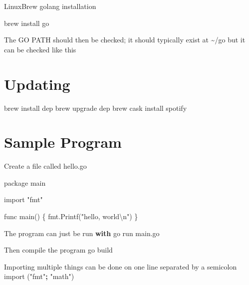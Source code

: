 \documentclass[]{book}
\newenvironment{Shaded}{\begin{snugshade}}{\end{snugshade}}
\newcommand{\BuiltInTok}[1]{#1}
\newcommand{\CharTok}[1]{\textcolor[rgb]{0.31,0.60,0.02}{#1}}
\newcommand{\ControlFlowTok}[1]{\textcolor[rgb]{0.13,0.29,0.53}{\textbf{#1}}}
\newcommand{\ExtensionTok}[1]{#1}
\newcommand{\ImportTok}[1]{#1}
\newcommand{\NormalTok}[1]{#1}
\newcommand{\OperatorTok}[1]{\textcolor[rgb]{0.81,0.36,0.00}{\textbf{#1}}}
\newcommand{\StringTok}[1]{\textcolor[rgb]{0.31,0.60,0.02}{#1}}
\newcommand{\VariableTok}[1]{\textcolor[rgb]{0.00,0.00,0.00}{#1}}
\begin{document}
LinuxBrew golang installation

\begin{Shaded}
\begin{Highlighting}[]
\ExtensionTok{brew}\NormalTok{ install go}
\end{Highlighting}
\end{Shaded}

The GO PATH should then be checked; it should typically exist at \textasciitilde{}/go but it can be checked like this

\begin{Shaded}
\end{Shaded}

\hypertarget{updating}{%
\section{Updating}\label{updating}}

\begin{Shaded}
\begin{Highlighting}[]
\ExtensionTok{brew}\NormalTok{ install dep}
\ExtensionTok{brew}\NormalTok{ upgrade dep}
\ExtensionTok{brew}\NormalTok{ cask install spotify}
\end{Highlighting}
\end{Shaded}

\hypertarget{sample-program}{%
\section{Sample Program}\label{sample-program}}

Create a file called hello.go

\begin{Shaded}
\begin{Highlighting}[]
\NormalTok{package main}

\ImportTok{import} \StringTok{"fmt"}

\NormalTok{func main() \{}
\NormalTok{    fmt.Printf(}\StringTok{"hello, world}\CharTok{\textbackslash{}n}\StringTok{"}\NormalTok{)}
\NormalTok{\}}

\NormalTok{The program can just be run }\ControlFlowTok{with}
\NormalTok{go run main.go}

\NormalTok{Then }\BuiltInTok{compile}\NormalTok{ the program}
\NormalTok{    go build}

\NormalTok{Importing multiple things can be done on one line separated by a semicolon}
    \ImportTok{import}\NormalTok{ (}\StringTok{"fmt"}\OperatorTok{;} \StringTok{"math"}\NormalTok{)}
\end{Highlighting}
\end{Shaded}
\end{document}
